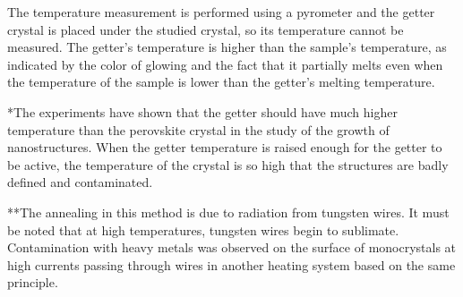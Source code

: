 \begin{table}
{\begin{tabular}{@{}lllllll@{}}
		\end{tabular}}
		\begin{tablenotes}
			\small
			\item *The temperature measurement is performed using a pyrometer and the getter crystal is placed under the studied crystal, so its temperature cannot be measured. The getter's temperature is higher than the sample's temperature, as indicated by the color of glowing and the fact that it partially melts even when the temperature of the sample is lower than the getter's melting temperature. 
			\item **The experiments have shown that the getter should have much higher temperature than the perovskite crystal in the study of the growth of nanostructures. When the getter temperature is raised enough for the getter to be active, the temperature of the crystal is so high that the structures are badly defined and contaminated. 
			\item ***The annealing in this method is due to radiation from tungsten wires. It must      be noted that at      high temperatures, tungsten wires begin to sublimate. Contamination with heavy metals was  observed on the surface of monocrystals at high currents passing through wires in another heating system based on the same principle.
		\end{tablenotes}	
\end{table}

\endgroup





